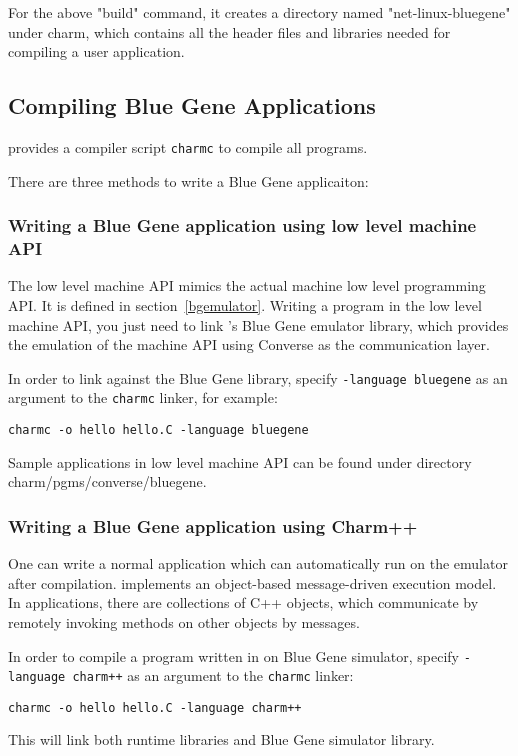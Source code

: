 For the above "build" command, it creates a directory named 
"net-linux-bluegene" under charm, which contains all the header files and
libraries needed for compiling a user application.

\subsection{Compiling Blue Gene Applications}

\charmpp{} provides a compiler script {\tt charmc} to compile all programs.

There are three methods to write a Blue Gene applicaiton:

\subsubsection{Writing a Blue Gene application using low level machine API}
The low level machine API mimics the actual machine low level programming
API. It is defined in section~\ref{bgemulator}. Writing a program in the 
low level machine API, you just need to link \charmpp{}'s Blue Gene emulator
library, which provides the emulation of the machine API using Converse as
the communication layer.

In order to link against the Blue Gene library, specify 
\texttt{-language bluegene} as an argument to the {\tt charmc} linker, 
for example:
\begin{verbatim}
charmc -o hello hello.C -language bluegene
\end{verbatim}

Sample applications in low level machine API can be found under directory
charm/pgms/converse/bluegene.

\subsubsection{Writing a Blue Gene application using Charm++}

One can write a normal \charmpp{} application which can automatically 
run on the emulator after compilation. \charmpp{} implements
an object-based message-driven execution model. In \charmpp{} applications,
there are collections of C++ objects, which communicate by remotely invoking
methods on other objects by messages.

In order to compile a program written in \charmpp{} on Blue Gene simulator, 
specify \texttt{-language charm++} as an argument to the {\tt charmc} linker:
\begin{verbatim}
charmc -o hello hello.C -language charm++
\end{verbatim}
This will link both \charmpp{} runtime libraries and Blue Gene simulator 
library.

